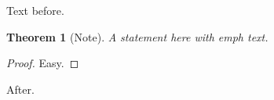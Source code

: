 \documentclass{article}
\newtheorem{theorem}{Theorem}
\begin{document}
Text before.
\begin{theorem}[Note] A statement here with \emph{emph} text.\end{theorem}
\begin{proof}Easy.\end{proof}
After.
\end{document}
